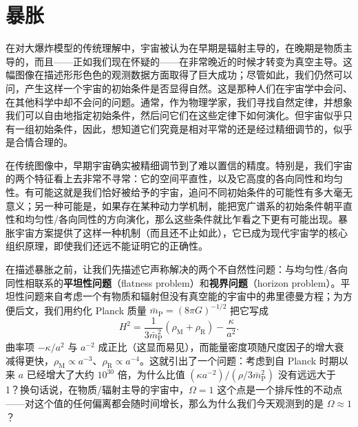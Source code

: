 \section{暴胀}

在对大爆炸模型的传统理解中，宇宙被认为在早期是辐射主导的，在晚期是物质主导的，而且——正如我们现在怀疑的——在非常晚近的时候才转变为真空主导。这幅图像在描述形形色色的观测数据方面取得了巨大成功；尽管如此，我们仍然可以问，产生这样一个宇宙的初始条件是否显得自然。这是那种人们在宇宙学中会问、在其他科学中却不会问的问题。通常，作为物理学家，我们寻找自然定律，并想象我们可以自由地指定初始条件，然后问它们在这些定律下如何演化。但宇宙似乎只有一组初始条件，因此，想知道它们究竟是相对平常的还是经过精细调节的，似乎是合情合理的。

在传统图像中，早期宇宙确实被精细调节到了难以置信的精度。特别是，我们宇宙的两个特征看上去非常不寻常：它的空间平直性，以及它高度的各向同性和均匀性。有可能这就是我们恰好被给予的宇宙，追问不同初始条件的可能性有多大毫无意义；另一种可能是，如果存在某种动力学机制，能把宽广谱系的初始条件朝平直性和均匀性/各向同性的方向演化，那么这些条件就比乍看之下更有可能出现。暴胀宇宙方案提供了这样一种机制（而且还不止如此），它已成为现代宇宙学的核心组织原理，即使我们还远不能证明它的正确性。

在描述暴胀之前，让我们先描述它声称解决的两个不自然性问题：与均匀性/各向同性相联系的\textbf{平坦性问题}（flatness problem）和\textbf{视界问题}（horizon problem）。平坦性问题来自考虑一个有物质和辐射但没有真空能的宇宙中的弗里德曼方程；为方便后文，我们用约化 Planck 质量 $\bar{m}_{\mathrm{P}}=(8\pi G)^{-1/2}$ 把它写成
\begin{equation*}
H^{2} = \frac{1}{3\bar{m}_{\mathrm{P}}^{2}}\left(\rho_{\mathrm{M}}+\rho_{\mathrm{R}}\right) - \frac{\kappa}{a^{2}}.
\tag{8.180}
\end{equation*}
曲率项 $-\kappa/a^{2}$ 与 $a^{-2}$ 成正比（这显而易见），而能量密度项随尺度因子的增大衰减得更快，$\rho_{\mathrm{M}}\propto a^{-3}$、$\rho_{\mathrm{R}}\propto a^{-4}$。这就引出了一个问题：考虑到自 Planck 时期以来 $a$ 已经增大了大约 $10^{30}$ 倍，为什么比值 $(\kappa a^{-2})/(\rho/3\bar{m}_{\mathrm{P}}^{2})$ 没有远远大于 1？换句话说，在物质/辐射主导的宇宙中，$\Omega=1$ 这个点是一个排斥性的不动点——对这个值的任何偏离都会随时间增长，那么为什么我们今天观测到的是 $\Omega\approx 1$？

